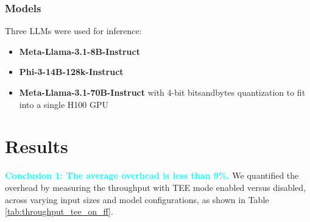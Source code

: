 \documentclass{article}
\newcommand{\peng}[1]{\textcolor{cyan}{#1}}
\begin{document}
\subsubsection{Models}

Three LLMs were used for inference:

\begin{itemize}
    \item \textbf{Meta-Llama-3.1-8B-Instruct}
    \item \textbf{Phi-3-14B-128k-Instruct}
    \item \textbf{Meta-Llama-3.1-70B-Instruct} with 4-bit bitsandbytes quantization to fit into a single H100 GPU
\end{itemize}

\section{Results}

\peng{\noindent\textbf{Conclusion 1: The average overhead is less than 9\%.}} We quantified the overhead by measuring the throughput with TEE mode enabled versus disabled, across varying input sizes and model configurations, as shown in Table \ref{tab:throughput_tee_on_ff}.
\end{document}
